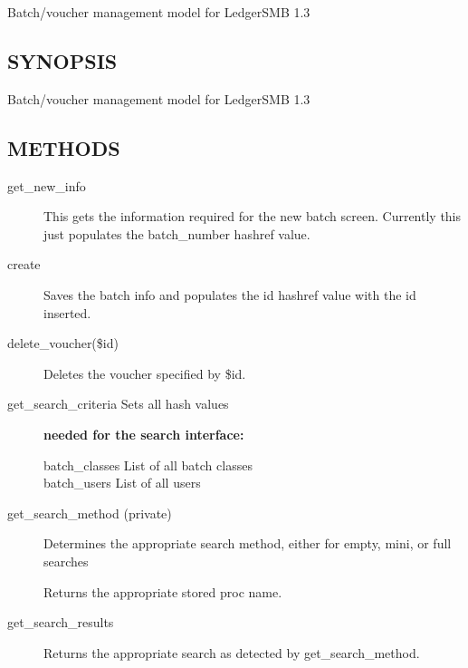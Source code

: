 \begin{description}
\begin{description}
\begin{description}
\begin{description}
\begin{description}
\begin{description}
\begin{description}
Batch/voucher management model for LedgerSMB 1.3

\subsection*{SYNOPSIS\label{LedgerSMB::Batch_SYNOPSIS}}


Batch/voucher management model for LedgerSMB 1.3

\subsection*{METHODS\label{LedgerSMB::Batch_METHODS}}
\begin{description}

\item[{get\_new\_info}] \mbox{}

This gets the information required for the new batch screen.  Currently this
just populates the batch\_number hashref value.


\item[{create}] \mbox{}

Saves the batch info and populates the id hashref value with the id inserted.


\item[{delete\_voucher(\$id)}] \mbox{}

Deletes the voucher specified by \$id.


\item[{get\_search\_criteria Sets all hash values}] \textbf{needed for the search interface:}\begin{description}

\item[{batch\_classes List of all batch classes}] \mbox{}
\item[{batch\_users
List of all users}] \mbox{}\end{description}

\item[{get\_search\_method (private)}] \mbox{}

Determines the appropriate search method, either for empty, mini, or full 
searches



Returns the appropriate stored proc name.


\item[{get\_search\_results}] \mbox{}

Returns the appropriate search as detected by get\_search\_method.



\end{description}
\end{description}
\end{description}
\end{description}
\end{description}
\end{description}
\end{description}
\end{description}
